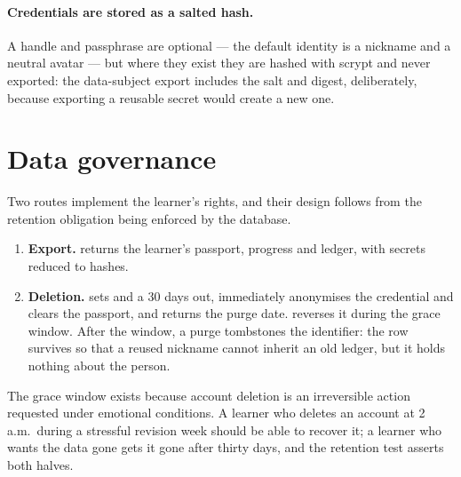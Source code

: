 \paragraph{Credentials are stored as a salted hash.} A handle and passphrase are optional
--- the default identity is a nickname and a neutral avatar --- but where they exist they
are hashed with scrypt and never exported: the data-subject export includes the salt and
digest, deliberately, because exporting a reusable secret would create a new one.

\section{Data governance}
\label{sec:datasubject}

Two routes implement the learner's rights, and their design follows from the retention
obligation being enforced by the database.

\begin{enumerate}[leftmargin=1.6em,itemsep=2pt]
  \item \textbf{Export.}  returns the learner's passport, progress and
        ledger, with secrets reduced to hashes.
  \item \textbf{Deletion.}  sets  and a
         30 days out, immediately anonymises the credential and clears the
        passport, and returns the purge date.  reverses it during the
        grace window. After the window, a purge tombstones the identifier: the row survives
        so that a reused nickname cannot inherit an old ledger, but it holds nothing about
        the person.
\end{enumerate}

The grace window exists because account deletion is an irreversible action requested
under emotional conditions. A learner who deletes an account at 2\,a.m.\ during a stressful
revision week should be able to recover it; a learner who wants the data gone gets it gone
after thirty days, and the retention test asserts both halves.
